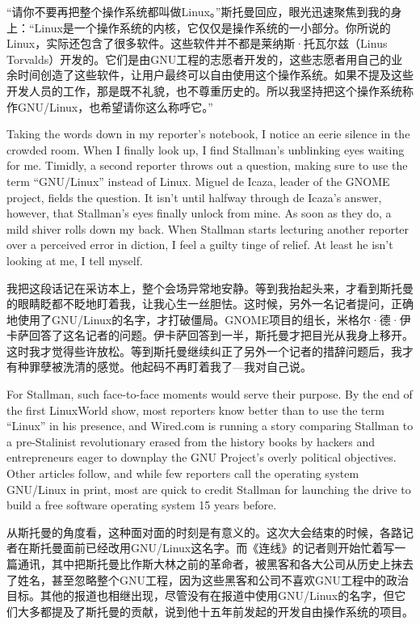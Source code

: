 \ifdefined\chs
``请你不要再把整个操作系统都叫做Linux。''斯托曼回应，眼光迅速聚焦到我的身上：``Linux是一个操作系统的内核，它仅仅是操作系统的一小部分。你所说的Linux，实际还包含了很多软件。这些软件并不都是莱纳斯·托瓦尔兹（Linus Torvalds）开发的。它们是由GNU工程的志愿者开发的，这些志愿者用自己的业余时间创造了这些软件，让用户最终可以自由使用这个操作系统。如果不提及这些开发人员的工作，那是既不礼貌，也不尊重历史的。所以我坚持把这个操作系统称作GNU/Linux，也希望请你这么称呼它。''
\fi

\ifdefined\eng
Taking the words down in my reporter's notebook, I notice an eerie silence in the crowded room. When I finally look up, I find Stallman's unblinking eyes waiting for me. Timidly, a second reporter throws out a question, making sure to use the term ``GNU/Linux'' instead of Linux. Miguel de Icaza, leader of the GNOME project, fields the question. It isn't until halfway through de Icaza's answer, however, that Stallman's eyes finally unlock from mine. As soon as they do, a mild shiver rolls down my back. When Stallman starts lecturing another reporter over a perceived error in diction, I feel a guilty tinge of relief. At least he isn't looking at me, I tell myself.
\fi

\ifdefined\chs
我把这段话记在采访本上，整个会场异常地安静。等到我抬起头来，才看到斯托曼的眼睛眨都不眨地盯着我，让我心生一丝胆怯。这时候，另外一名记者提问，正确地使用了GNU/Linux的名字，才打破僵局。GNOME项目的组长，米格尔·德·伊卡萨回答了这名记者的问题。伊卡萨回答到一半，斯托曼才把目光从我身上移开。这时我才觉得些许放松。等到斯托曼继续纠正了另外一个记者的措辞问题后，我才有种罪孽被洗清的感觉。他起码不再盯着我了---我对自己说。
\fi

\ifdefined\eng
For Stallman, such face-to-face moments would serve their purpose. By the end of the first LinuxWorld show, most reporters know better than to use the term ``Linux'' in his presence, and Wired.com is running a story comparing Stallman to a pre-Stalinist revolutionary erased from the history books by hackers and entrepreneurs eager to downplay the GNU Project's overly political objectives. Other articles follow, and while few reporters call the operating system GNU/Linux in print, most are quick to credit Stallman for launching the drive to build a free software operating system 15 years before.
\fi

\ifdefined\chs
从斯托曼的角度看，这种面对面的时刻是有意义的。这次大会结束的时候，各路记者在斯托曼面前已经改用GNU/Linux这名字。而《连线》的记者则开始忙着写一篇通讯，其中把斯托曼比作斯大林之前的革命者，被黑客和各大公司从历史上抹去了姓名，甚至忽略整个GNU工程，因为这些黑客和公司不喜欢GNU工程中的政治目标。其他的报道也相继出现，尽管没有在报道中使用GNU/Linux的名字，但它们大多都提及了斯托曼的贡献，说到他十五年前发起的开发自由操作系统的项目。
\fi


